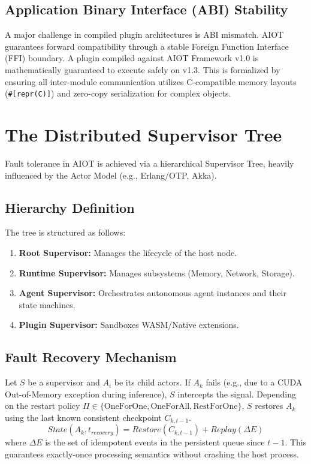 \documentclass[conference,compsoc]{IEEEtran}
\begin{document}
\subsection{Application Binary Interface (ABI) Stability}
A major challenge in compiled plugin architectures is ABI mismatch. AIOT guarantees forward compatibility through a stable Foreign Function Interface (FFI) boundary. A plugin compiled against AIOT Framework v1.0 is mathematically guaranteed to execute safely on v1.3. This is formalized by ensuring all inter-module communication utilizes C-compatible memory layouts (\texttt{\#[repr(C)]}) and zero-copy serialization for complex objects.

\section{The Distributed Supervisor Tree}
Fault tolerance in AIOT is achieved via a hierarchical Supervisor Tree, heavily influenced by the Actor Model (e.g., Erlang/OTP, Akka). 

\subsection{Hierarchy Definition}
The tree is structured as follows:
\begin{enumerate}
    \item \textbf{Root Supervisor:} Manages the lifecycle of the host node.
    \item \textbf{Runtime Supervisor:} Manages subsystems (Memory, Network, Storage).
    \item \textbf{Agent Supervisor:} Orchestrates autonomous agent instances and their state machines.
    \item \textbf{Plugin Supervisor:} Sandboxes WASM/Native extensions.
\end{enumerate}

\subsection{Fault Recovery Mechanism}
Let $S$ be a supervisor and $A_i$ be its child actors. If $A_k$ fails (e.g., due to a CUDA Out-of-Memory exception during inference), $S$ intercepts the signal. Depending on the restart policy $\Pi \in \{\text{OneForOne}, \text{OneForAll}, \text{RestForOne}\}$, $S$ restores $A_k$ using the last known consistent checkpoint $C_{k, t-1}$.
\begin{equation}
    State(A_k, t_{recovery}) = Restore(C_{k, t-1}) + Replay(\Delta E)
\end{equation}
where $\Delta E$ is the set of idempotent events in the persistent queue since $t-1$. This guarantees exactly-once processing semantics without crashing the host process.
\end{document}

